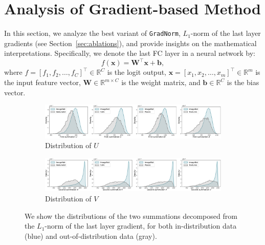 \documentclass{article}
\def\*#1{\mathbf{#1}}
\begin{document}
\section{Analysis of Gradient-based Method}
\label{sec:analysis}
In this section, we analyze the best variant of \texttt{GradNorm}, $L_1$-norm of the last layer gradients (see Section~\ref{sec:ablations}), and provide insights on the mathematical interpretations.
Specifically, we denote the last FC layer in a neural network by: 
\begin{equation}
    f(\*x) = \*W^\top\*x + \mathbf{b},
\end{equation}
where $f = [f_1, f_2, \dots, f_C]^\top \in \mathbb{R}^C$ is the logit output, $\mathbf{x} = [x_1, x_2, \dots, x_m]^\top \in \mathbb{R}^m$ is the input feature vector, $\mathbf{W} \in \mathbb{R}^{m \times C}$ is the weight matrix, and $\mathbf{b} \in \mathbb{R}^C$ is the bias vector.



\begin{figure}[t]
    \centering
    \begin{subfigure}{1\textwidth}
    \includegraphics[width=1.0\textwidth]{figures/first_summation_final.pdf}
    \caption{Distribution of  $U$}
    \end{subfigure}
    \begin{subfigure}{1\textwidth}
    \includegraphics[width=1.0\textwidth]{figures/second_summation_final.pdf}
    \caption{Distribution of $V$}
    \end{subfigure}
    \caption{\small{We show the distributions of the two summations decomposed from the $L_1$-norm of the last layer gradient, for both in-distribution data (blue) and out-of-distribution data (gray). }}
    \label{fig:first_and_second_sum}
\end{figure}
\end{document}

